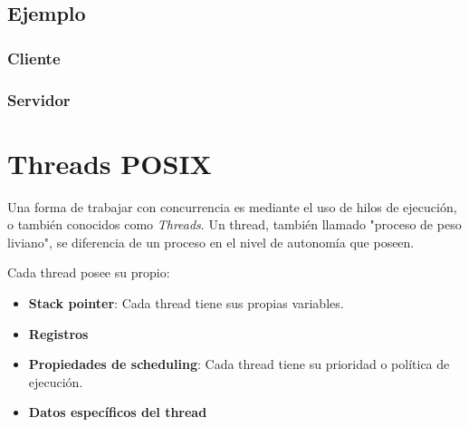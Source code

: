 \documentclass[a4paper, twoside]{article}
\newcommand{\codedir}{../resources/code} %
\begin{document}

\newpage
\subsection{Ejemplo}
\subsubsection{Cliente}


\newpage
\subsubsection{Servidor}


\newpage
\section{Threads POSIX}
Una forma de trabajar con concurrencia es mediante el uso de hilos de ejecución, o también conocidos como \emph{Threads}. Un thread, también llamado "proceso de peso liviano", se diferencia de un proceso en el nivel de autonomía que poseen.

Cada thread posee su propio:
\begin{itemize}
	\item \textbf{Stack pointer}: Cada thread tiene sus propias variables.
	\item \textbf{Registros}
	\item \textbf{Propiedades de scheduling}: Cada thread tiene su prioridad o política de ejecución.
	\item \textbf{Datos específicos del thread}
\end{itemize}
\end{document}
